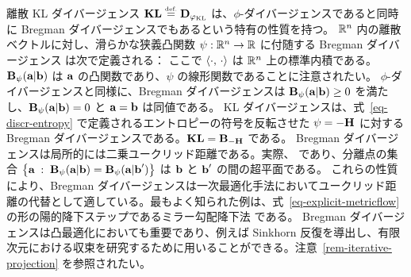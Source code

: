 \begin{remark}\label{rem-bregman}
離散 KL ダイバージェンス $\mathrm{\textbf{KL}} \stackrel{\mbox{\upshape\tiny def.}}{=} \mathrm{\textbf{D}}_{\varphi_{\operatorname{KL}}}$ は、$\phi$-ダイバージェンスであると同時に Bregman ダイバージェンスでもあるという特有の性質を持つ。
%
$\mathbb{R}^n$ 内の離散ベクトルに対し、滑らかな狭義凸関数 $\psi : \mathbb{R}^n \rightarrow \mathbb{R}$ に付随する Bregman ダイバージェンス \citep{bregman1967relaxation} は次で定義される：
ここで $\langle \cdot,\,\cdot\rangle$ は $\mathbb{R}^n$ 上の標準内積である。$\mathrm{\textbf{B}}_\psi(\mathrm{\textbf{a}}|\mathrm{\textbf{b}})$ は $\mathrm{\textbf{a}}$ の凸関数であり、$\psi$ の線形関数であることに注意されたい。
%
$\phi$-ダイバージェンスと同様に、Bregman ダイバージェンスは $\mathrm{\textbf{B}}_\psi(\mathrm{\textbf{a}}|\mathrm{\textbf{b}}) \geq 0$ を満たし、$\mathrm{\textbf{B}}_\psi(\mathrm{\textbf{a}}|\mathrm{\textbf{b}})=0$ と $\mathrm{\textbf{a}}=\mathrm{\textbf{b}}$ は同値である。
%
KL ダイバージェンスは、式~\eqref{eq-discr-entropy} で定義されるエントロピーの符号を反転させた $\psi = -\mathrm{\textbf{H}}$ に対する Bregman ダイバージェンスである。\ie $\mathrm{\textbf{KL}} = \mathrm{\textbf{B}}_{-\mathrm{\textbf{H}}}$ である。
%
Bregman ダイバージェンスは局所的には二乗ユークリッド距離である。実際、
であり、分離点の集合 $\left\{ \mathrm{\textbf{a}} \;:\; \mathrm{\textbf{B}}_\psi(\mathrm{\textbf{a}}|\mathrm{\textbf{b}}) = \mathrm{\textbf{B}}_\psi(\mathrm{\textbf{a}}|\mathrm{\textbf{b}}') \right\}$ は $\mathrm{\textbf{b}}$ と $\mathrm{\textbf{b}}'$ の間の超平面である。
%
これらの性質により、Bregman ダイバージェンスは一次最適化手法においてユークリッド距離の代替として適している。最もよく知られた例は、式~\eqref{eq-explicit-metricflow} の形の陽的降下ステップであるミラー勾配降下法 \citep{beck2003mirror} である。
%
Bregman ダイバージェンスは凸最適化においても重要であり、例えば Sinkhorn 反復を導出し、有限次元における収束を研究するために用いることができる。注意~\ref{rem-iterative-projection} を参照されたい。
\end{remark}

